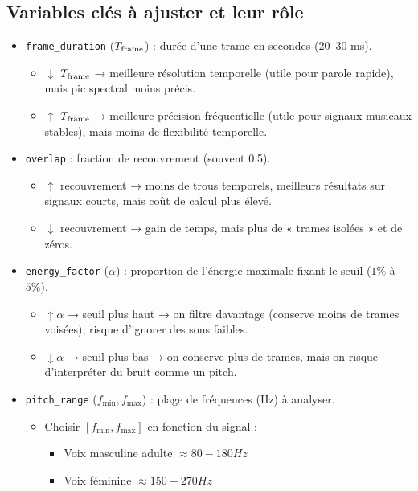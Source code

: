 \subsection{Variables clés à ajuster et leur rôle}

\begin{itemize}
  \item \texttt{frame\_duration} (\(T_\mathrm{frame}\)) : durée d’une trame en secondes (20–30 ms).  
    \begin{itemize}
      \item \(\downarrow\) \(T_\mathrm{frame}\) → meilleure résolution temporelle (utile pour parole rapide), mais pic spectral moins précis.  
      \item \(\uparrow\) \(T_\mathrm{frame}\) → meilleure précision fréquentielle (utile pour signaux musicaux stables), mais moins de flexibilité temporelle.  
    \end{itemize}
  \item \texttt{overlap} : fraction de recouvrement (souvent 0,5).  
    \begin{itemize}
      \item \(\uparrow\) recouvrement → moins de trous temporels, meilleurs résultats sur signaux courts, mais coût de calcul plus élevé.  
      \item \(\downarrow\) recouvrement → gain de temps, mais plus de « trames isolées » et de zéros.  
    \end{itemize}
  \item \texttt{energy\_factor} (\(\alpha\)) : proportion de l’énergie maximale fixant le seuil (\(1\%\) à \(5\%\)).  
    \begin{itemize}
      \item \(\uparrow\alpha\) → seuil plus haut → on filtre davantage (conserve moins de trames voisées), risque d’ignorer des sons faibles.  
      \item \(\downarrow\alpha\) → seuil plus bas → on conserve plus de trames, mais on risque d’interpréter du bruit comme un pitch.  
    \end{itemize}
  \item \texttt{pitch\_range} (\(f_{\min}, f_{\max}\)) : plage de fréquences (Hz) à analyser.  
    \begin{itemize}
      \item Choisir \([f_{\min},f_{\max}]\) en fonction du signal :  
        \begin{itemize}
          \item Voix masculine adulte $\approx 80-180 Hz$  
          \item Voix féminine $\approx 150-270 Hz$  

\end{itemize}
\end{itemize}
\end{itemize}
